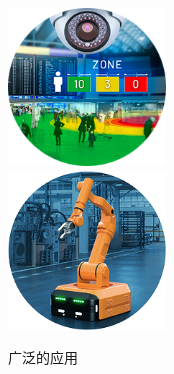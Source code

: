 \documentclass[UTF8]{ctexart}
\begin{document}
\begin{figure}[htbp]
{\begin{minipage}[t]{0.33\linewidth}
			\vspace{0.02cm}
			\includegraphics[width=1.651in]{5.png}\\
			\vspace{0.02cm}
			\includegraphics[width=1.651in]{6.png}\\
			\vspace{0.02cm}
		\end{minipage}%
	}%
	
	
	\centering
	\caption{广泛的应用}
	\vspace{-0.2cm}
	\label{fig:compare_fig}
\end{figure}
\end{document}
